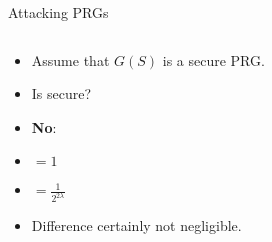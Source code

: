 \documentclass[aspectratio=169, lualatex, handout]{beamer}
\begin{document}
\begin{frame}{Attacking PRGs}
	\begin{columns}[c]
		\begin{column}{0.45\textwidth}
			\begin{itemize}
				\item<1-3> Assume that $G(S)$ is a secure PRG.
				\item<1-3> Is  secure?
				\item<1-3> \textbf{No}:
				\item<1-3>  $ = 1$
				\item<2-3>  $ = \frac{1}{2^{2\lambda}}$
				\item<3> Difference certainly not negligible.
			\end{itemize}
		\end{column}
		\begin{column}{0.55\textwidth}
			\begin{flushright}
			\end{flushright}
		\end{column}
	\end{columns}
\end{frame}
\end{document}
